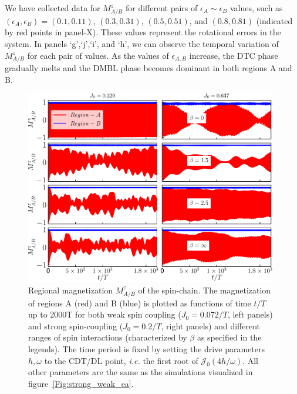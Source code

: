\documentclass[12pt]{iopart}
\begin{document}
We have collected data for $M^z_{A/B}$ for different pairs of $\epsilon_A \sim \epsilon_B$ values, such as $(\epsilon_{A},\epsilon_{B}) = (0.1,0.11)$, $(0.3,0.31)$, $(0.5,0.51)$, and $(0.8,0.81)$ (indicated by red points in panel-X). These values represent the rotational errors in the system. In panels `g',`j',`i', and `h', we can observe the temporal variation of $M^z_{A/B}$ for each pair of values. As the values of $\epsilon_{A,B}$ increase, the DTC phase gradually melts and the DMBL phase becomes dominant in both regions A and B.
\begin{figure}[t]
	\centering
	\hspace{1.5cm}\includegraphics[width = 11cm]{figure9.pdf}
	\caption{Regional magnetization $M^z_{A/B}$ of the spin-chain. The magnetization of regions A (red) and B (blue) is plotted as functions of time $t/T$ up to 2000T for both weak spin coupling ($J_0=0.072/T$, left panels) and strong spin-coupling ($J_0=0.2/T$, right panels) and different ranges of spin interactions (characterized by $\beta$ as specified in the legends). The time period is fixed by setting the drive parameters $h,\omega$ to the CDT/DL point, \textit{i.e.} the first root of $\mathcal{J}_0(4h/\omega)$. All other parameters are the same as the simulations visualized in figure~\ref{Fig:strong_weak_ea}.}
	\label{Fig:regiogionalmag}
\end{figure}
\end{document}
